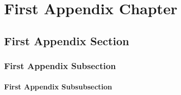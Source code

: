 \documentclass[
thesis  %
]{csthes}
\begin{document}



\appendix
\chapter{First Appendix Chapter}
\section{First Appendix Section}
\subsection{First Appendix Subsection}
\subsubsection{First Appendix Subsubsection}

\cleardoublepage

\end{document}
